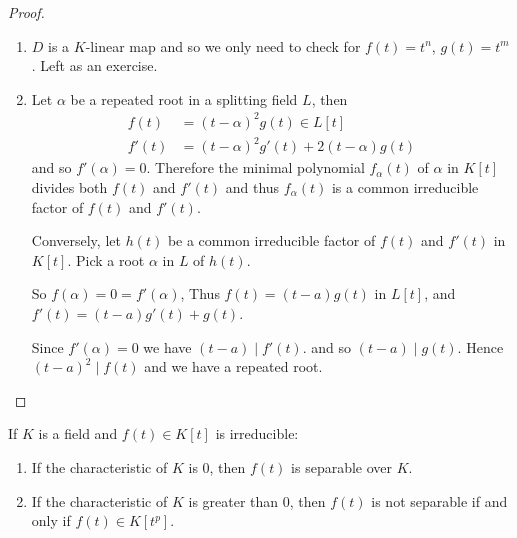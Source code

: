 \documentclass{article}
\begin{document}
\begin{proof}
    \leavevmode
    \begin{enumerate}[label=(\alph*)]
        \item $D$ is a $K$-linear map and so we only need to check for $f(t) = t^n$, $g(t) = t^m$. Left as an exercise.
        \item Let $\alpha$ be a repeated root in a splitting field $L$, then
            \begin{align*}
                f(t) &= (t-\alpha)^2 g(t) \in L[t] \\
                f'(t) &= (t-\alpha)^2 g'(t) + 2(t-\alpha) g(t)
            \end{align*}
            and so $f'(\alpha) = 0$.
            Therefore the minimal polynomial $f_\alpha(t)$ of $\alpha$ in $K[t]$ divides both $f(t)$ and $f'(t)$ and thus $f_\alpha(t)$ is a common irreducible factor of $f(t)$ and $f'(t)$.


            Conversely, let $h(t)$ be a common irreducible factor of $f(t)$ and $f'(t)$ in $K[t]$.
            Pick a root $\alpha$ in $L$ of $h(t)$.

            So $f(\alpha) = 0 = f'(\alpha)$, Thus $f(t) = (t-a) g(t)$ in $L[t]$, and $f'(t) = (t-a) g'(t) + g(t)$.

            Since $f'(\alpha)  = 0$ we have $(t-a) \mid f'(t)$. and so $(t-a) \mid g(t)$. Hence $(t-a)^2 \mid f(t)$ and we have a repeated root.
    \end{enumerate}
\end{proof}

\begin{ncor}\label{cor:2.4}
    If $K$ is a field and $f(t) \in K[t]$ is irreducible:
    \begin{enumerate}[label=(\roman*)]
        \item If the characteristic of $K$ is 0, then $f(t)$ is separable over $K$.
        \item If the characteristic of $K$ is greater than 0, then $f(t)$ is not separable if and only if $f(t) \in K[t^p]$.
    \end{enumerate}
\end{ncor}
\end{document}
